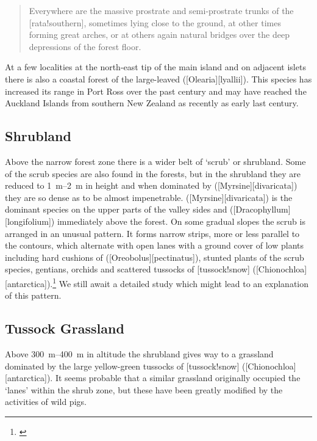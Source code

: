 \begin{quote}
	Everywhere are the massive prostrate and semi-prostrate trunks of the [rata!southern], sometimes lying close to the ground, at other times forming great arches, or at others again natural bridges over the deep depressions of the forest floor.
\end{quote}

At a few localities at the north-east tip of the main island and on adjacent islets there is also a coastal forest of the large-leaved  ([Olearia][lyallii]).
This species has increased its range in Port Ross over the past century and may have reached the Auckland Islands from southern New Zealand as recently as early last century.

\subsection{Shrubland}

Above the narrow forest zone there is a wider belt of `scrub' or shrubland.
Some of the scrub species are also found in the forests, but in the shrubland they are reduced to \SIrange{1}{2}{\metre} in height and when dominated by  ([Myrsine][divaricata]) they are so dense as to be almost impenetrable.  ([Myrsine][divaricata]) is the dominant species on the upper parts of the valley sides and  ([Dracophyllum][longifolium]) immediately above the  forest.
On some gradual slopes the scrub is arranged in an unusual pattern.
It forms narrow strips, more or less parallel to the contours, which alternate with open lanes with a ground cover of low plants including hard cushions of  ([Oreobolus][pectinatus]), stunted plants of the scrub species, gentians, orchids and scattered tussocks of [tussock!snow] ([Chionochloa][antarctica]).\footnote{\cite{godley1965notes}}
We still await a detailed study which might lead to an explanation of this pattern.

\subsection{Tussock Grassland}

Above \SIrange{300}{400}{\metre} in altitude the shrubland gives way to a grassland dominated by the large yellow-green tussocks of [tussock!snow] ([Chionochloa][antarctica]).
It seems probable that a similar grassland originally occupied the `lanes' within the shrub zone, but these have been greatly modified by the activities of wild pigs.

